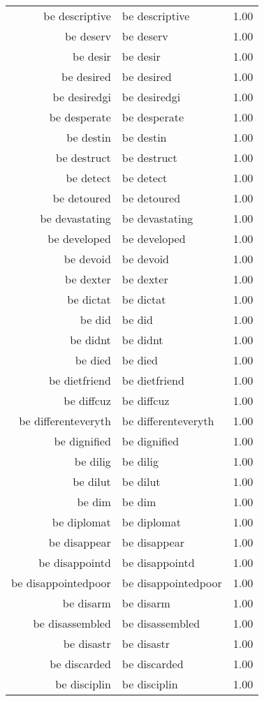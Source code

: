 \begin{table}[ht]
\begin{tabular}{rlr}
  be descriptive & be descriptive & 1.00 \\ 
  be deserv & be deserv & 1.00 \\ 
  be desir & be desir & 1.00 \\ 
  be desired & be desired & 1.00 \\ 
  be desiredgi & be desiredgi & 1.00 \\ 
  be desperate & be desperate & 1.00 \\ 
  be destin & be destin & 1.00 \\ 
  be destruct & be destruct & 1.00 \\ 
  be detect & be detect & 1.00 \\ 
  be detoured & be detoured & 1.00 \\ 
  be devastating & be devastating & 1.00 \\ 
  be developed & be developed & 1.00 \\ 
  be devoid & be devoid & 1.00 \\ 
  be dexter & be dexter & 1.00 \\ 
  be dictat & be dictat & 1.00 \\ 
  be did & be did & 1.00 \\ 
  be didnt & be didnt & 1.00 \\ 
  be died & be died & 1.00 \\ 
  be dietfriend & be dietfriend & 1.00 \\ 
  be diffcuz & be diffcuz & 1.00 \\ 
  be differenteveryth & be differenteveryth & 1.00 \\ 
  be dignified & be dignified & 1.00 \\ 
  be dilig & be dilig & 1.00 \\ 
  be dilut & be dilut & 1.00 \\ 
  be dim & be dim & 1.00 \\ 
  be diplomat & be diplomat & 1.00 \\ 
  be disappear & be disappear & 1.00 \\ 
  be disappointd & be disappointd & 1.00 \\ 
  be disappointedpoor & be disappointedpoor & 1.00 \\ 
  be disarm & be disarm & 1.00 \\ 
  be disassembled & be disassembled & 1.00 \\ 
  be disastr & be disastr & 1.00 \\ 
  be discarded & be discarded & 1.00 \\ 
  be disciplin & be disciplin & 1.00 \\ 

\end{tabular}
\end{table}
